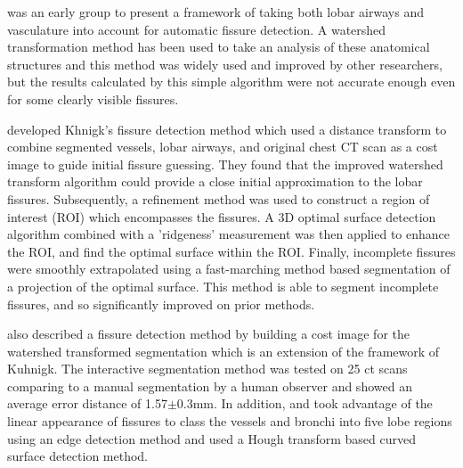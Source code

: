 \cite{kuhnigk2003lung,kuhnigk2005informatics} was an early group to present a framework of taking both lobar airways and vasculature into account for automatic fissure detection. A watershed transformation method has been used to take an analysis of these anatomical structures and this method was widely used and improved by other researchers, but the results calculated by this simple algorithm were not accurate enough even for some clearly visible fissures. 

\cite{ukil2009anatomy} developed Khnigk's fissure detection method which used a distance transform to combine segmented vessels, lobar airways, and original chest CT scan as a cost image to guide initial fissure guessing. They found that the improved watershed transform algorithm could provide a close initial approximation to the lobar fissures. Subsequently, a refinement method was used to construct a region of interest (ROI) which encompasses the fissures. A 3D optimal surface detection algorithm combined with a 'ridgeness' measurement was then applied to enhance the ROI, and find the optimal surface within the ROI. Finally, incomplete fissures were smoothly extrapolated using a fast-marching method based segmentation of a projection of the optimal surface. This method is able to segment incomplete fissures, and so significantly improved on prior methods.

\cite{lassen2010automatic} also described a fissure detection method by building a cost image for the watershed transformed segmentation which is an extension of the framework of Kuhnigk. The interactive segmentation method was tested on 25 \gls{ct} scans comparing to a manual segmentation by a human observer and showed an average error distance of 1.57$ \pm $0.3mm. In addition, \cite{zhou2004automatic} and \cite{saita2006algorithm} took advantage of the linear appearance of fissures to class the vessels and bronchi into five lobe regions using an edge detection method and used a Hough transform based curved surface detection method. 

